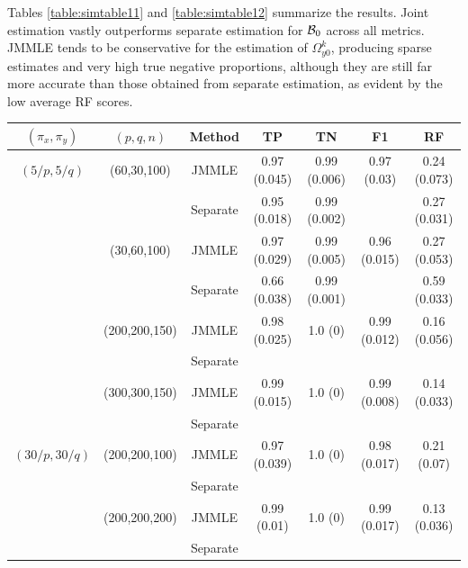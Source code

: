 Tables \ref{table:simtable11} and \ref{table:simtable12} summarize the results. Joint estimation vastly outperforms separate estimation for ${\cal{B}}_0$ across all metrics. JMMLE tends to be conservative for the estimation of $\Omega_{y0}^k$, producing sparse estimates and very high true negative proportions, although they are still far more accurate than those obtained from separate estimation, as evident by the low average RF scores.
%

\begin{scriptsize}
\begin{table}
    \begin{tabular}{ccccccc}
    \hline
    $(\pi_x, \pi_y)$ & $(p,q,n)$   & Method   & TP            & TN             & F1 & RF            \\ \hline
    $(5/p, 5/q)$   & (60,30,100)   & JMMLE    & 0.97 (0.045) & 0.99 (0.006)   & 0.97 (0.03)  & 0.24 (0.073) \\
    ~              & ~             & Separate & 0.95 (0.018) & 0.99 (0.002)  & ~   & 0.27 (0.031) \\
    ~              & (30,60,100)   & JMMLE    & 0.97 (0.029) & 0.99 (0.005)  & 0.96 (0.015)   & 0.27 (0.053) \\
    ~              & ~             & Separate & 0.66 (0.038) & 0.99 (0.001) & ~   & 0.59 (0.033) \\
    ~              & (200,200,150) & JMMLE    & 0.98 (0.025) & 1.0 (0)      & 0.99 (0.012)   & 0.16 (0.056) \\
    ~              & ~             & Separate & ~             & ~              & ~   & ~             \\
    ~              & (300,300,150) & JMMLE    & 0.99 (0.015) & 1.0 (0)      & 0.99 (0.008)   & 0.14 (0.033)\\
    ~              & ~             & Separate & ~             & ~              & ~   & ~             \\\hline
    $(30/p, 30/q)$ & (200,200,100) & JMMLE    & 0.97 (0.039) & 1.0 (0)      & 0.98 (0.017)   & 0.21 (0.07) \\
    ~              & ~             & Separate & ~             & ~              & ~   & ~             \\
    ~              & (200,200,200) & JMMLE    & 0.99 (0.01)  & 1.0 (0)      & 0.99 (0.017)   & 0.13 (0.036) \\
    ~              & ~             & Separate & ~             & ~              & ~   & ~             \\ \hline
    \end{tabular}

\end{table}
\end{scriptsize}
